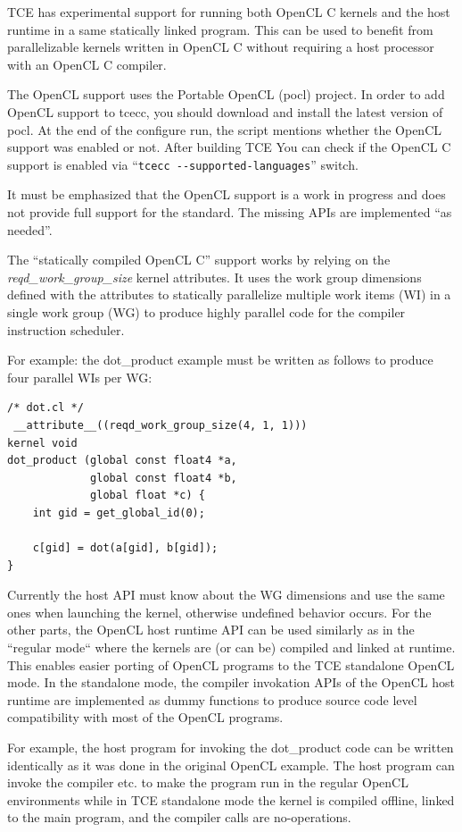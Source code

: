 \documentclass[twoside]{tceusermanual}
\begin{document}
TCE has experimental support for running both OpenCL C kernels and the host 
runtime in a same statically linked program. This can be used to benefit from
parallelizable kernels written in OpenCL C without requiring a host processor 
with an OpenCL C compiler.

The OpenCL support uses the {Portable OpenCL (pocl)} project. In order to
add OpenCL support to tcecc, you should download and install the latest version of 
pocl. At the end of the configure run, the script 
mentions whether the OpenCL support was enabled or not. After building TCE
You can check if the OpenCL C support is enabled via ``\verb|tcecc --supported-languages|''
switch.

It must be emphasized that the OpenCL support is a work in progress and
does not provide full support for the standard. The missing APIs are
implemented ``as needed''.

The ``statically compiled OpenCL C'' support works by relying on the
\textit{reqd\_work\_group\_size} kernel attributes. It uses the work
group dimensions defined with the attributes to statically parallelize 
multiple work items (WI) in a single work group (WG) to produce highly 
parallel code for the compiler instruction scheduler.

For example: the dot\_product example must be written as follows to
produce four parallel WIs per WG:

\begin{verbatim}
/* dot.cl */
 __attribute__((reqd_work_group_size(4, 1, 1)))
kernel void
dot_product (global const float4 *a,
             global const float4 *b, 
             global float *c) {
    int gid = get_global_id(0);

    c[gid] = dot(a[gid], b[gid]);    
} 
\end{verbatim}

Currently the host API must know about the WG dimensions and use the
same ones when launching the kernel, otherwise undefined behavior
occurs. For the other parts, the OpenCL host runtime API can be used 
similarly as in the ``regular mode`` where the kernels are (or can be)
compiled and linked at runtime. This enables easier porting 
of OpenCL programs to the TCE standalone OpenCL mode. In the
standalone mode, the compiler invokation APIs of the OpenCL host runtime 
are implemented as dummy functions to produce source code level 
compatibility with most of the OpenCL programs.

For example, the host program for invoking the dot\_product code
can be written identically as it was done in the original OpenCL
example. The host program can invoke the compiler etc. to make
the program run in the regular OpenCL environments while in TCE
standalone mode the kernel is compiled offline, linked to the
main program, and the compiler calls are no-operations.
\end{document}
